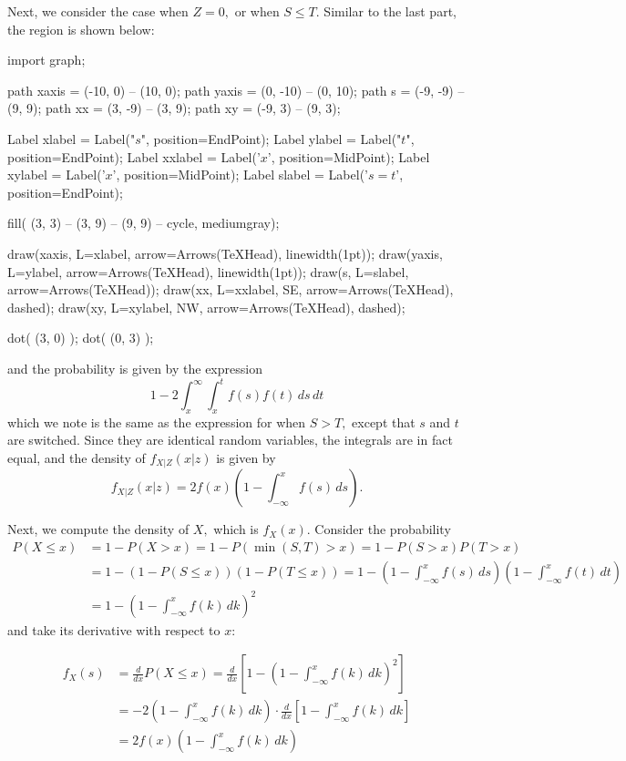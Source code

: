 \documentclass{article}
\begin{document}
\begin{enumerate}
\begin{enumerate}
\begin{enumerate}
\begin{soln}
				Next, we consider the case when $Z=0,$ or when $S\le T.$ Similar to the last part, the region is shown below:

				\begin{center}
					\begin{asy}
						import graph;

						path xaxis = (-10, 0) -- (10, 0);
						path yaxis = (0, -10) -- (0, 10);
						path s = (-9, -9) -- (9, 9);
						path xx = (3, -9) -- (3, 9);
						path xy = (-9, 3) -- (9, 3);

						Label xlabel = Label("$s$", position=EndPoint);
						Label ylabel = Label("$t$", position=EndPoint);
						Label xxlabel = Label('$x$', position=MidPoint);
						Label xylabel = Label('$x$', position=MidPoint);
						Label slabel = Label('$s=t$', position=EndPoint);

						fill( (3, 3) -- (3, 9) -- (9, 9) -- cycle, mediumgray);

						draw(xaxis, L=xlabel, arrow=Arrows(TeXHead), linewidth(1pt));
						draw(yaxis, L=ylabel, arrow=Arrows(TeXHead), linewidth(1pt));
						draw(s, L=slabel, arrow=Arrows(TeXHead));
						draw(xx, L=xxlabel, SE, arrow=Arrows(TeXHead), dashed);
						draw(xy, L=xylabel, NW, arrow=Arrows(TeXHead), dashed);

						dot( (3, 0) );
						dot( (0, 3) );
					\end{asy}
				\end{center}
				and the probability is given by the expression \[1-2\int_x^\infty \int_x^t f(s)f(t)\, ds\, dt\] which we note is the same as the expression for when $S>T,$ except that $s$ and $t$ are switched. Since they are identical random variables, the integrals are in fact equal, and the density of $f_{X|Z}(x|z)$ is given by \[f_{X|Z}(x|z)=2f(x)\left( 1-\int_{-\infty}^x f(s)\, ds \right).\]


				Next, we compute the density of $X,$ which is $f_X(x).$ Consider the probability 
			\begin{align*}
				P(X\le x)&=1-P(X>x)=1-P(\min{(S, T)}>x) = 1-P(S>x)P(T>x) \\
				&= 1-(1-P(S\le x))(1-P(T\le x)) = 1-\left( 1-\int_{-\infty}^x f(s)\, ds \right)\left( 1-\int_{-\infty}^x f(t)\, dt \right) \\
				&= 1-\left( 1-\int_{-\infty}^x f(k)\, dk \right)^2
			\end{align*} and take its derivative with respect to $x:$

			\begin{align*}
				f_X(s) &= \frac{d}{dx}P(X\le x) = \frac{d}{dx}\left[ 1-\left( 1-\int_{-\infty}^x f(k)\, dk \right)^2 \right] \\
				&= -2\left( 1-\int_{-\infty}^x f(k)\, dk \right)\cdot\frac{d}{dx}\left[ 1-\int_{-\infty}^x f(k)\, dk \right] \\
				&= 2f(x)\left( 1-\int_{-\infty}^x f(k)\, dk \right)
			\end{align*}


\end{soln}
\end{enumerate}
\end{enumerate}
\end{enumerate}
\end{document}
